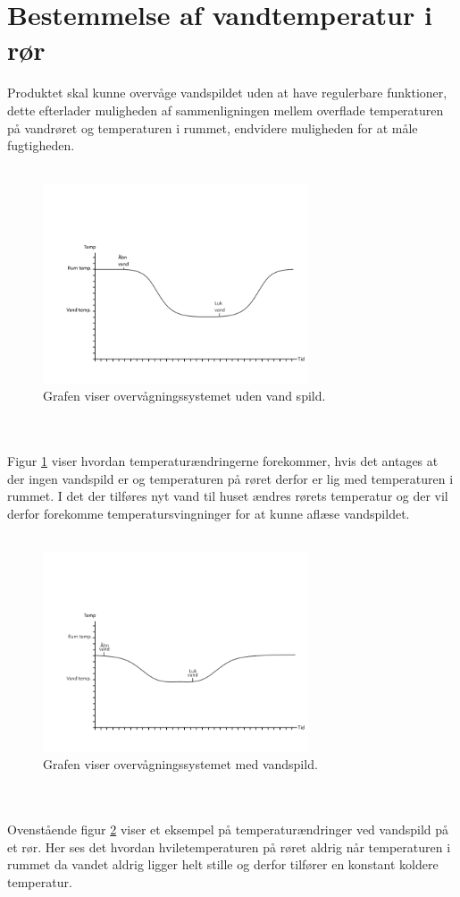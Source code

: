 \section{Bestemmelse af vandtemperatur i rør}
Produktet skal kunne overvåge vandspildet uden at have regulerbare funktioner, dette efterlader muligheden af sammenligningen mellem overflade temperaturen på vandrøret og temperaturen i rummet, endvidere muligheden for at måle fugtigheden.  
\\
\\
\begin{figure}[h!]
  \centering
  \includegraphics[width=0.7\textwidth]{figures/vandspild_graf_normal.png}
  \caption{Grafen viser overvågningssystemet uden vand spild.}
  \label{vandspild_graf_normal}
\end{figure}
\\
\\
Figur \ref{vandspild_graf_normal} viser hvordan temperaturændringerne forekommer, hvis det antages at der ingen vandspild er og temperaturen på røret derfor er lig med temperaturen i rummet. I det der tilføres nyt vand til huset ændres rørets temperatur og der vil derfor forekomme temperatursvingninger for at kunne aflæse vandspildet.
\\
\\
\begin{figure}[h!]
  \centering
  \includegraphics[width=0.7\textwidth]{figures/vandspild_graf_spild.png}
  \caption{Grafen viser overvågningssystemet med vandspild.}
  \label{vandspild_graf_spild}
\end{figure}
\\
\\
Ovenstående figur \ref{vandspild_graf_spild} viser et eksempel på temperaturændringer ved vandspild på et rør. Her ses det hvordan hviletemperaturen på røret aldrig når temperaturen i rummet da vandet aldrig ligger helt stille og derfor tilfører en konstant koldere temperatur.  



    